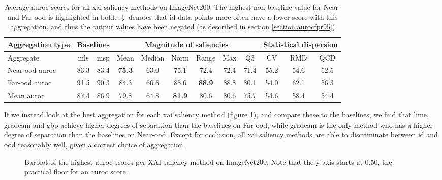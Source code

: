 \documentclass[UKenglish]{uiomasterthesis} %
\theoremstyle{definition}
\begin{document}
\begin{table}[H]
\setlength\tabcolsep{3pt}
\begin{center}
\begin{tabular}{ |p{5.1em}|c c|c c c c c c|c c c| }
    \hline
     \centering Aggregation type & \multicolumn{2}{c|}{Baselines} & \multicolumn{6}{c|}{Magnitude of saliencies} & \multicolumn{3}{p{8em}|}{\centering Statistical dispersion} \\
    \hline
    Aggregate & \ac{mls} & \ac{msp} & Mean & Median & Norm & Range & Max & Q3 & CV & RMD & QCD  \\
    \hline
    \rowcolor{near!50}
    Near-\ac{ood} \ac{auroc} & 83.3 & 83.4 &\textbf{ 75.3 }& 63.0 & 75.1 & 72.4 & 72.4 & 71.4 & 55.2 & 54.6 & 52.5  \\
    \hline
    \rowcolor{far!50}
    Far-\ac{ood} \ac{auroc} & 91.5 & 90.3 & 84.3 & 66.6 & 88.6 &\textbf{ 88.9 }& 88.8 & 80.1 & 54.0 & 62.1 & 56.3  \\
    \hline
    Mean \ac{auroc} & 87.4 & 86.9 & 79.8 & 64.8 &\textbf{ 81.9 }& 80.6 & 80.6 & 75.7 & 54.6 & 58.4 & 54.4  \\
    \hline
    \end{tabular}
    \caption[Average \ac{auroc} scores over all \ac{xai} saliency methods on ImageNet200]{Average \ac{auroc} scores for all \ac{xai} saliency methods on ImageNet200. The highest non-baseline value for Near- and Far-\ac{ood} is highlighted in bold. $\downarrow$ denotes that \ac{id} data points more often have a lower score with this aggregation, and thus the output values have been negated (as described in section \ref{section:aurocfpr95})}
    \label{table:imagenet200_all_metrics}
\end{center}
\setlength\tabcolsep{6pt}
\end{table}

If we instead look at the best aggregation for each \ac{xai} saliency method (figure \ref{fig:imagenet200_all_generators_barplot}), and compare these to the baselines, we find that \ac{lime}, \ac{gradcam} and \ac{gbp} achieve higher degrees of separation than the baselines on Far-\ac{ood}, while \ac{gradcam} is the only method who has a higher degree of separation than the baselines on Near-\ac{ood}. Except for occlusion, all \ac{xai} saliency methods are able to discriminate between \ac{id} and \ac{ood} reasonably well, given a correct choice of aggregation.

\begin{figure}[H]
    \begin{center}
        
    \end{center}
    \caption[Highest AUROC score for each XAI saliency method on ImageNet200]{Barplot of the highest \ac{auroc} scores per XAI saliency method on ImageNet200. Note that the y-axis starts at 0.50, the practical floor for an \ac{auroc} score.}
    \label{fig:imagenet200_all_generators_barplot}
\end{figure}
\end{document}
